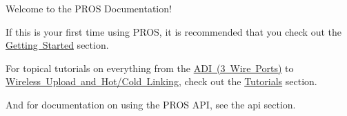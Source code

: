 Welcome to the P\+R\+OS Documentation!

If this is your first time using P\+R\+OS, it is recommended that you check out the \mbox{\hyperlink{getting-started}{Getting Started}} section.

For topical tutorials on everything from the \mbox{\hyperlink{adi_8md}{A\+DI (3 Wire Ports)}} to \mbox{\hyperlink{wireless-upload_8md}{Wireless Upload and Hot/\+Cold Linking}}, check out the \mbox{\hyperlink{tutorials}{Tutorials}} section.

And for documentation on using the P\+R\+OS A\+PI, see the api section. 